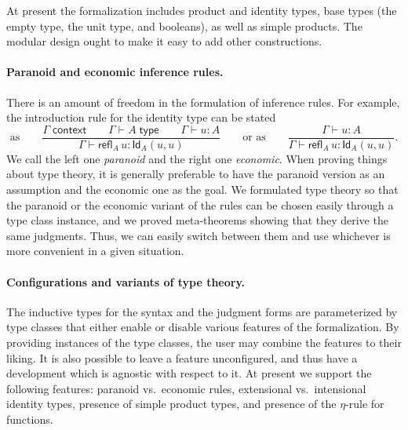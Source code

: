 \documentclass{easychair}
\newcommand{\Id}[3]{\mathsf{Id}_{#1}(#2,#3)}
\newcommand{\refl}[2]{\mathsf{refl}_{#1}\,#2}
\newcommand{\ctx}{\Gamma}
\newcommand{\isctx}{\ctx\;\mathsf{context}}
\newcommand{\istype}[1]{\ctx \vdash #1 \;\mathsf{type}}
\newcommand{\isterm}[2]{\ctx \vdash #1 : #2}
\begin{document}
At present the formalization includes product and identity types, base types (the empty
type, the unit type, and booleans), as well as simple products. The modular design ought
to make it easy to add other constructions.


\paragraph*{Paranoid and economic inference rules.}


There is an amount of freedom in the formulation of inference rules. For example, the
introduction rule for the identity type can be stated
%
\begin{equation*}
  \text{as}\qquad
  \frac{\isctx \qquad
  \istype{A} \qquad
  \isterm{u}{A}
  }{\isterm{\refl{A}{u}}{\Id{A}{u}{u}}}
  \qquad\text{or as}\qquad
  \frac{\isterm{u}{A}
  }{\isterm{\refl{A}{u}}{\Id{A}{u}{u}}}.
\end{equation*}
%
We call the left one \emph{paranoid} and the right one \emph{economic}. When proving things about type theory, it is generally
preferable to have the paranoid version as an assumption and the economic one as the goal.
We formulated type theory so that the paranoid or the economic variant of the rules can be
chosen easily through a type class instance, and we proved meta-theorems showing that they
derive the same judgments. Thus, we can easily switch between them and use whichever is
more convenient in a given situation.

\paragraph*{Configurations and variants of type theory.}
\label{sec:config-variant}


The inductive types for the syntax and the judgment forms are parameterized by type classes
that either enable or disable various features of the formalization. By providing
instances of the type classes, the user may combine the features to their liking. It is
also possible to leave a feature unconfigured, and thus have a development which is
agnostic with respect to it. At present we support the following features: paranoid
vs.~economic rules, extensional vs.~intensional identity types, presence of simple product
types, and presence of the $\eta$-rule for functions.
\end{document}
